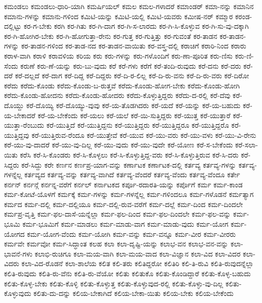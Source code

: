 {ಕಮಂಡಲು
ಕಮಂಡಲು-ಧಾರಿ-ಯಾಗಿ
ಕಮರ್ಷಿಯಲ್
ಕಮಲ
ಕಮಲ-ಗಳಾದರೆ
ಕಮಾಂಡರ್
ಕಮಾ-ನನ್ನು
ಕಮಾನಿನ
ಕಮಾನು-ಗಳನ್ನು
ಕಮಾನು-ಗಳಿಂದ
ಕಮಿಟಿ-ಯನ್ನು
ಕಮಿಟಿ-ಯಲ್ಲಿ
ಕಮಿಟಿ-ಯವರು
ಕಮೀಷ-ನರ್
ಕಮ್ಮಾರ
ಕರಂಡ-ದಲ್ಲಿಟ್ಟು
ಕರ-ಗ-ಬೇಕು
ಕರಗಿ
ಕರ-ಗಿತು
ಕರ-ಗಿ-ದಾಗ
ಕರ-ಗಿ-ಸ-ಲಾರದು
ಕರ-ಗಿ-ಸಿ-ಕೊಳ್ಳುವ
ಕರ-ಗಿ-ಸು-ವು-ದಕ್ಕಾಗಿ
ಕರ-ಗಿ-ಹೋಗಿರ-ಬೇಕು
ಕರ-ಗಿ-ಹೋಗುತ್ತಾ-ರೇನು
ಕರ-ಗುತ್ತ
ಕರ-ಗುತ್ತಿತ್ತು
ಕರ-ಗುವಂತೆ
ಕರ-ತಾಡನ
ಕರ-ತಾಡನ-ಗಳನ್ನು
ಕರ-ತಾಡನ-ಗಳಿಂದ
ಕರ-ತಾಡ-ನದ
ಕರ-ತಾಡನ-ವಾಯಿತು
ಕರ-ವಸ್ತ್ರ-ದಲ್ಲಿ
ಕರಾಚಿಗೆ
ಕರಾರಿ-ನಿಂದ
ಕರಾರು
ಕರಾಳ-ವಾಗಿ
ಕರಾಳಿ
ಕರಾವಳಿಯ
ಕರಿಯ
ಕರು
ಕರು-ಗಳನ್ನು
ಕರು-ಗಳೊಂದಿಗೆ
ಕರು-ಣಾ-ಪೂರಿತ
ಕರು-ಣಿಸು
ಕರು-ಣಿ-ಸೆಂದು
ಕರುಣೆ
ಕರು-ಣೆ-ಯನ್ನು
ಕರು-ಬು-ವುದು
ಕರೆ
ಕರೆ-ಗಳು
ಕರೆಗೆ
ಕರೆ-ತಂದಿ-ರುವುದು
ಕರೆ-ದನು
ಕರೆ-ದರು
ಕರೆ-ದರೆ
ಕರೆ-ದಲ್ಲದೆ
ಕರೆ-ದಾಗ
ಕರೆ-ದಿದ್ದ
ಕರೆ-ದಿದ್ದರು
ಕರೆ-ದಿ-ರ-ಲಿಲ್ಲ
ಕರೆ-ದಿ-ರು-ವನು
ಕರೆ-ದಿ-ರು-ವರು
ಕರೆ-ದಿರೋ
ಕರೆದು
ಕರೆದು-ಕೊಂಡು
ಕರೆದು-ಕೊಂಡು-ಬ-ರುತ್ತವೆ
ಕರೆದು-ಕೊಂಡು-ಹೋಗ-ಬೇಕು
ಕರೆದು-ಕೊಂಡು-ಹೋಗಿ
ಕರೆದು-ಕೊಂಡು-ಹೋದನು
ಕರೆದು-ಕೊಂಡು-ಹೋದರು
ಕರೆದು-ಕೊಳ್ಳುತ್ತಿದ್ದರು
ಕರೆದು-ದ-ರಲ್ಲಿ
ಕರೆ-ದೆವು
ಕರೆ-ದೊಯ್ದು
ಕರೆ-ದೊಯ್ಯಿ
ಕರೆ-ದೊಯ್ಯು-ವುವು
ಕರೆ-ಯ-ತೊಡಗಿದರು
ಕರೆ-ಯದೆ
ಕರೆ-ಯನ್ನು
ಕರೆ-ಯ-ಬಹುದು
ಕರೆ-ಯ-ಬೇಕಾದರೆ
ಕರೆ-ಯ-ಬೇಕೆಂದು
ಕರೆ-ಯಲು
ಕರೆ-ಯಲೆ
ಕರೆ-ಯಿ-ಸುತ್ತಿದ್ದರು
ಕರೆ-ಯುತ್ತ
ಕರೆ-ಯುತ್ತಾರೆ
ಕರೆ-ಯುತ್ತಾ-ರೆಂಬುದು
ಕರೆ-ಯುತ್ತಿದೆ
ಕರೆ-ಯುತ್ತಿದ್ದನು
ಕರೆ-ಯುತ್ತಿದ್ದರು
ಕರೆ-ಯುತ್ತಿದ್ದರೂ
ಕರೆ-ಯುತ್ತಿದ್ದರೊ
ಕರೆ-ಯುತ್ತಿದ್ದವು
ಕರೆ-ಯುತ್ತಿರುವ-ರೆಂದೂ
ಕರೆ-ಯುತ್ತೇವೆ
ಕರೆ-ಯುವ
ಕರೆ-ಯು-ವರು
ಕರೆ-ಯು-ವಳು
ಕರೆ-ಯು-ವಿ-ರೇನು
ಕರೆ-ಯು-ವು-ದಾದರೆ
ಕರೆ-ಯು-ವು-ದಿಲ್ಲ
ಕರೆ-ಯು-ವುದು
ಕರೆ-ಯು-ವುದೇ
ಕರೆ-ಯೋಣ
ಕರೆ-ಸ-ಬೇಕೆಂದು
ಕರೆ-ಸಲಾ-ಯಿತು
ಕರೆಸಿ
ಕರೆ-ಸಿ-ಕೊಂಡರು
ಕರೆ-ಸಿ-ಕೊಳ್ಳಲು
ಕರೆ-ಸಿ-ಕೊಳ್ಳುತ್ತಿದ್ದ-ವರು
ಕರೆ-ಸಿ-ಕೊಳ್ಳುತ್ತಿರುವ
ಕರೆ-ಸಿ-ದರು
ಕರೆ-ಸಿದ್ದರು
ಕರೆ-ಸಿದ್ದು
ಕರೇ
ಕರ್ಣನ
ಕರ್ಣಪ್ರ-ಯಾಗ-ವನ್ನು
ಕರ್ಣಾಟಕ
ಕರ್ಣಾಟಕ-ದಲ್ಲಿ
ಕರ್ತವ್ಯ
ಕರ್ತವ್ಯ-ಗಳನ್ನು
ಕರ್ತವ್ಯ-ಗಳನ್ನೆಲ್ಲ
ಕರ್ತವ್ಯದ
ಕರ್ತವ್ಯ-ವನ್ನು
ಕರ್ತವ್ಯ-ವಾಗಿದೆ
ಕರ್ತವ್ಯ-ವೆಂದರೆ
ಕರ್ತವ್ಯ-ವೆಂದು
ಕರ್ತವ್ಯ-ವೆಂದೂ
ಕರ್ತೇ
ಕರ್ನನ್
ಕರ್ನನ್ಗೆ
ಕರ್ನನ್ನ-ವರೆಗೆ
ಕರ್ನಲ್
ಕರ್ನಾಟಕದ
ಕರ್ಪೂ-ರದಾರತಿ-ಯನ್ನು
ಕರ್ಪೊಗೆ
ಕರ್ಮ
ಕರ್ಮ-ಕಾಂಡ
ಕರ್ಮ-ಕೋಟೆ-ಯೊಳಗೆ
ಕರ್ಮಕ್ಕೆ
ಕರ್ಮ-ಗಳನ್ನು
ಕರ್ಮ-ಗಳನ್ನೆಲ್ಲ
ಕರ್ಮ-ಗಳಿಂದಲೂ
ಕರ್ಮ-ಗಳೊಡನೆ
ಕರ್ಮತ್ಯಾಗ
ಕರ್ಮದ
ಕರ್ಮ-ದಲ್ಲಿ
ಕರ್ಮ-ದಲ್ಲಿಯೂ
ಕರ್ಮ-ದಲ್ಲಿ-ರುವ-ವರೆಗೆ
ಕರ್ಮ-ದಲ್ಲೆ
ಕರ್ಮ-ದಿಂದ
ಕರ್ಮ-ದಿಂದಲೇ
ಕರ್ಮಪ್ರ-ವೃತ್ತಿ
ಕರ್ಮ-ಫಲ-ದಾಸೆ-ಯನ್ನೆಲ್ಲಾ
ಕರ್ಮ-ಫಲ-ದಿಂದ
ಕರ್ಮ-ಫಲ-ದಿಂದಲೇ
ಕರ್ಮ-ಫಲ-ವನ್ನು
ಕರ್ಮ-ಭೂಮಿ
ಕರ್ಮ-ಭೂಮಿಗೆ
ಕರ್ಮ-ಮಾಡಲು
ಕರ್ಮ-ಮಾಡು-ವಾಗ
ಕರ್ಮ-ಮಾಡು-ವುದು
ಕರ್ಮ-ಯೋಗ
ಕರ್ಮ-ಯೋಗದ
ಕರ್ಮ-ಯೋಗ-ವೆಂದು
ಕರ್ಮ-ಯೋಗಿ
ಕರ್ಮ-ವನ್ನು
ಕರ್ಮ-ವನ್ನೂ
ಕರ್ಮ-ವೀರ
ಕರ್ಮ-ವೀರರು
ಕರ್ಮವೇ
ಕರ್ಮವೋ
ಕರ್ಮ-ಸಿದ್ಧಾಂತ
ಕಲಹ
ಕಲಾ
ಕಲಾ-ದೃಷ್ಟಿ-ಯನ್ನು
ಕಲಾಭ-ವನ
ಕಲಾಭ-ವನ-ವನ್ನು
ಕಲಾ-ಭಾವನೆ-ಗಳು
ಕಲಾಭಿ-ರುಚಿಗೂ
ಕಲಾ-ಮಯ-ವಾಗಿ
ಕಲಾ-ಮಯ-ವಾದ
ಕಲಾ-ವಿಜ್ಞಾನ
ಕಲಾ-ವಿದ
ಕಲಾ-ವಿದರ
ಕಲಾ-ವಿದರು
ಕಲಾ-ವಿದ-ರೊಡನೆ
ಕಲಾ-ಶಾಲೆಯ
ಕಲಿತ
ಕಲಿ-ತರು
ಕಲಿತಿದ್ದರೋ
ಕಲಿತಿರಿ
ಕಲಿ-ತಿ-ರುವಿ
ಕಲಿತಿ-ರುವುದನ್ನೆಲ್ಲಾ
ಕಲಿತಿ-ರುವುದು
ಕಲಿತಿ-ರು-ವೆನು
ಕಲಿತಿ-ರು-ವೆಯೋ
ಕಲಿತು
ಕಲಿತುಕೊ
ಕಲಿತು-ಕೊಂಡಿದ್ದಾರೆ
ಕಲಿತು-ಕೊಳ್ಳ-ಬಹುದು
ಕಲಿತು-ಕೊಳ್ಳ-ಬೇಕು
ಕಲಿತು-ಕೊಳ್ಳಿ
ಕಲಿತು-ಕೊಳ್ಳುತ್ತ
ಕಲಿತು-ಕೊಳ್ಳುವುದ-ರಲ್ಲಿ
ಕಲಿತು-ಕೊಳ್ಳು-ವು-ದಿಲ್ಲ
ಕಲಿತು-ಕೊಳ್ಳುವುದು
ಕಲಿತು-ದು-ದನ್ನು
ಕಲಿಯ-ಬೇಕಾಗಿದೆ
ಕಲಿಯ-ಬೇಕಾ-ಯಿತು
ಕಲಿಯ-ಬೇಕು
ಕಲಿಯ-ಬೇಕೆಂದು
}
